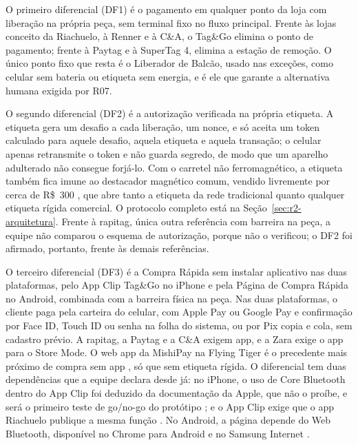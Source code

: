 O primeiro diferencial (DF1) é o pagamento em qualquer ponto da loja com liberação na própria peça, sem terminal fixo no fluxo principal. Frente às lojas conceito da Riachuelo, à Renner e à C\&A, o Tag\&Go elimina o ponto de pagamento; frente à Paytag e à SuperTag 4, elimina a estação de remoção. O único ponto fixo que resta é o Liberador de Balcão, usado nas exceções, como celular sem bateria ou etiqueta sem energia, e é ele que garante a alternativa humana exigida por R07.

O segundo diferencial (DF2) é a autorização verificada na própria etiqueta. A etiqueta gera um desafio a cada liberação, um nonce, e só aceita um token calculado para aquele desafio, aquela etiqueta e aquela transação; o celular apenas retransmite o token e não guarda segredo, de modo que um aparelho adulterado não consegue forjá-lo. Com o carretel não ferromagnético, a etiqueta também fica imune ao destacador magnético comum, vendido livremente por cerca de R\$~300 \cite{canalautomacao2026desacoplador}, que abre tanto a etiqueta da rede tradicional quanto qualquer etiqueta rígida comercial. O protocolo completo está na Seção~\ref{sec:r2-arquitetura}. Frente à rapitag, única outra referência com barreira na peça, a equipe não comparou o esquema de autorização, porque não o verificou; o DF2 foi afirmado, portanto, frente às demais referências.

O terceiro diferencial (DF3) é a Compra Rápida sem instalar aplicativo nas duas plataformas, pelo App Clip Tag\&Go no iPhone e pela Página de Compra Rápida no Android, combinada com a barreira física na peça. Nas duas plataformas, o cliente paga pela carteira do celular, com Apple Pay ou Google Pay e confirmação por Face ID, Touch ID ou senha na folha do sistema, ou por Pix copia e cola, sem cadastro prévio. A rapitag, a Paytag e a C\&A exigem app, e a Zara exige o app para o Store Mode. O web app da MishiPay na Flying Tiger é o precedente mais próximo de compra sem app \cite{mishipay2026flyingtiger}, só que sem etiqueta rígida. O diferencial tem duas dependências que a equipe declara desde já: no iPhone, o uso de Core Bluetooth dentro do App Clip foi deduzido da documentação da Apple, que não o proíbe, e será o primeiro teste de go/no-go do protótipo \cite{apple2026appclipfuncoes}; e o App Clip exige que o app Riachuelo publique a mesma função \cite{apple2026appclipcriar}. No Android, a página depende do Web Bluetooth, disponível no Chrome para Android e no Samsung Internet \cite{chrome2026webbluetooth}.

